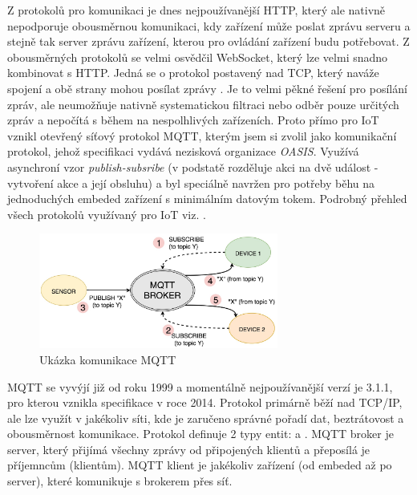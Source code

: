 Z protokolů pro komunikaci je dnes nejpoužívanější HTTP, který ale nativně nepodporuje obousměrnou komunikaci, kdy zařízení může poslat zprávu serveru a stejně tak server zprávu zařízení, kterou pro ovládání zařízení budu potřebovat. Z obousměrných protokolů se velmi osvědčil WebSocket, který lze velmi snadno kombinovat s HTTP. Jedná se o protokol postavený nad TCP, který naváže spojení a obě strany mohou posílat zprávy \cite{websocket}. Je to velmi pěkné řešení pro posílání zpráv, ale neumožňuje nativně systematickou filtraci nebo odběr pouze určitých zpráv a nepočítá s během na nespolhlivých zařízeních. Proto přímo pro IoT vznikl otevřený síťový protokol MQTT, kterým jsem si zvolil jako komunikační protokol, jehož specifikaci vydává nezisková organizace \textit{OASIS}. Využívá asynchroní vzor \textit{publish-subsribe} (v podstatě rozděluje akci na dvě událost - vytvoření akce a její obsluhu) a byl speciálně navržen pro potřeby běhu na jednoduchých embeded zařízení s minimálním datovým tokem. Podrobný přehled všech protokolů využívaný pro IoT viz. \cite{protocols}.

\begin{figure}[htbp]
    \centering
    \includegraphics[width=0.7\textwidth]{img/mqtt-communication.jpeg}
    \caption{Ukázka komunikace MQTT \cite{img-mqtt-communication}}
\end{figure}

\label{mqtt-description}
MQTT se vyvýjí již od roku 1999 a momentálně nejpoužívanější verzí je 3.1.1, pro kterou vznikla specifikace v roce 2014. Protokol primárně běží nad TCP/IP, ale lze využít v jakékoliv síti, kde je zaručeno správné pořadí dat, beztrátovost a obousměrnost komunikace. Protokol definuje 2 typy entit:  a . MQTT broker je server, který přijímá všechny zprávy od připojených klientů a přeposílá je příjemncům (klientům). MQTT klient je jakékoliv zařízení (od embeded až po server), které komunikuje s brokerem přes síť. \cite{mqtt}

